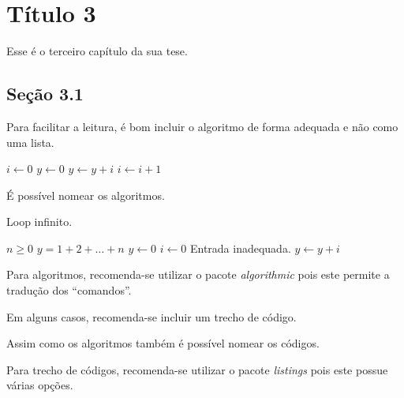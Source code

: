 \chapter{T\'itulo 3}
Esse \'e o terceiro cap\'itulo da sua tese.

\section{Se\c c\~ao 3.1}
Para facilitar a leitura, é bom incluir o algoritmo de forma adequada e não
como uma lista.
\begin{algorithmic}[2]
    \STATE $i \leftarrow 0$
    \STATE $y \leftarrow 0$
        \STATE $y \leftarrow y + i$
        \STATE $i \leftarrow i + 1$
    \ENDFOR
\end{algorithmic}

É possível nomear os algoritmos.
\begin{algorithm}
    \caption{Loop infinito.}
    \label{alg:loop_inf}
    \begin{algorithmic}
        \REQUIRE $n \geq 0$
        \ENSURE $y = 1 + 2 + \ldots + n$
        \STATE $y \leftarrow 0$
        \STATE $i \leftarrow 0$
            \PRINT Entrada inadequada.
        \ELSE
                \STATE $y \leftarrow y + i$
            \ENDWHILE
        \ENDIF
    \end{algorithmic}
\end{algorithm}

Para algoritmos, recomenda-se utilizar o pacote
\emph{algorithmic} pois este
permite a tradução dos ``comandos''.

Em alguns casos, recomenda-se incluir um trecho de
código.


Assim como os algoritmos também é possível nomear os códigos.


Para trecho de códigos,  recomenda-se utilizar o pacote
\emph{listings} pois
este possue várias opções.
